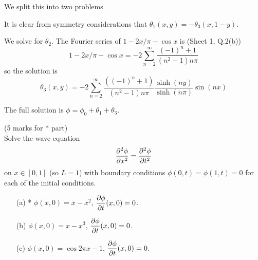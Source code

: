 \documentclass[12pt]{article}
\begin{document}
\begin{answer}
\begin{enumerate}
We split this into two problems

\begin{center}
 
\end{center}

It is clear from symmetry considerations that $\theta_1(x,y)=-\theta_3(x,1-y)$.

We solve for $\theta_2$. The Fourier series of $1-2x/\pi-\cos x$ is (Sheet 1, Q.2(b))
\[1-2x/\pi-\cos x=-2\sum_{n=2}^{\infty}\frac{(-1)^n+1}{(n^2-1)n\pi}\]
so the solution is
\[\theta_3(x,y)=-2\sum_{n=2}^{\infty}\frac{((-1)^n+1)}{(n^2-1)n\pi}\frac{\sinh(ny)}{\sinh(n\pi)}\sin(nx)\]

The full solution is $\phi=\phi_0+\theta_1+\theta_3$.
\end{enumerate}
\end{answer}
\newpage
\fi

\bigskip


\begin{question}(5 marks for * part)\\
Solve the wave equation
\[\dfrac{\partial^2 \phi}{\partial x^2}=\dfrac{\partial^2 \phi}{\partial t^2}\]
on $x\in [0,1]$ (so $L=1$) with boundary conditions $\phi(0,t)=\phi(1,t)=0$ for each of the initial conditions.
\begin{enumerate}
\item[(a)] * $\phi(x,0)=x-x^2$, $\dfrac{\partial \phi}{\partial t}(x,0)=0$.
\item[(b)] $\phi(x,0)=x-x^3$, $\dfrac{\partial \phi}{\partial t}(x,0)=0$.
\item[(c)] $\phi(x,0)=\cos 2\pi x-1$, $\dfrac{\partial \phi}{\partial t}(x,0)=0$.
\end{enumerate}

\end{question}
\end{document}
